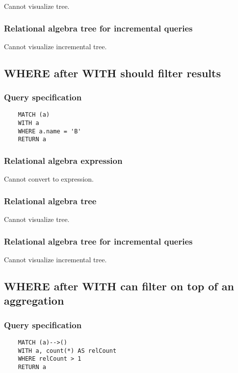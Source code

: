 	Cannot visualize tree.

	\subsubsection*{Relational algebra tree for incremental queries}

	Cannot visualize incremental tree.
	\subsection{WHERE after WITH should filter results}

	\subsubsection*{Query specification}

	\begin{lstlisting}
	MATCH (a)
	WITH a
	WHERE a.name = 'B'
	RETURN a
	\end{lstlisting}


	\subsubsection*{Relational algebra expression}

	Cannot convert to expression.

	\subsubsection*{Relational algebra tree}

	Cannot visualize tree.

	\subsubsection*{Relational algebra tree for incremental queries}

	Cannot visualize incremental tree.
	\subsection{WHERE after WITH can filter on top of an aggregation}

	\subsubsection*{Query specification}

	\begin{lstlisting}
	MATCH (a)-->()
	WITH a, count(*) AS relCount
	WHERE relCount > 1
	RETURN a
	\end{lstlisting}


